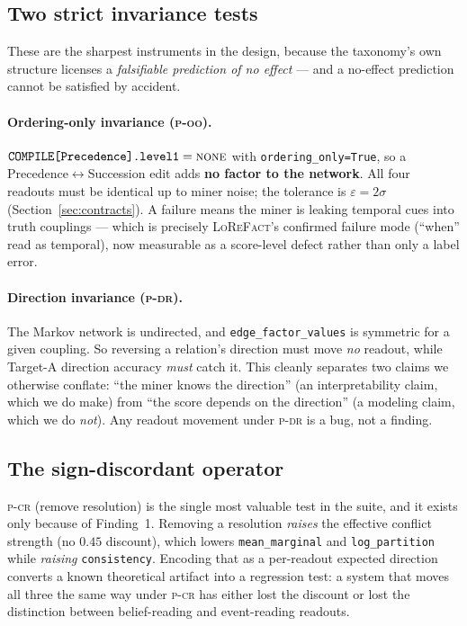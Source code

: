 \documentclass[11pt]{article}
\newcommand{\cNone}{\textsc{none}}
\newcommand{\readout}[1]{\texttt{#1}}
\begin{document}
\subsection{Two strict invariance tests}
\label{sec:invariance}

These are the sharpest instruments in the design, because the taxonomy's own structure
licenses a \emph{falsifiable prediction of no effect} --- and a no-effect prediction cannot be
satisfied by accident.

\paragraph{Ordering-only invariance (\textsc{p-oo}).}
$\texttt{COMPILE[Precedence].level1} = \cNone$ with \texttt{ordering\_only=True}, so a
Precedence$\leftrightarrow$Succession edit adds \textbf{no factor to the network}. All four
readouts must be identical up to miner noise; the tolerance is
$\varepsilon = 2\sigma$ (Section~\ref{sec:contracts}). A failure means the miner is leaking
temporal cues into truth couplings --- which is precisely \textsc{LoReFact}'s confirmed
failure mode (``when'' read as temporal), now measurable as a score-level defect rather than
only a label error.

\paragraph{Direction invariance (\textsc{p-dr}).}
The Markov network is undirected, and \texttt{edge\_factor\_values} is symmetric for a given
coupling. So reversing a relation's direction must move \emph{no} readout, while Target-A
direction accuracy \emph{must} catch it. This cleanly separates two claims we otherwise
conflate: ``the miner knows the direction'' (an interpretability claim, which we do make) from
``the score depends on the direction'' (a modeling claim, which we do \emph{not}). Any readout
movement under \textsc{p-dr} is a bug, not a finding.

\subsection{The sign-discordant operator}
\label{sec:signdiscord}

\textsc{p-cr} (remove resolution) is the single most valuable test in the suite, and it exists
only because of Finding~1. Removing a resolution \emph{raises} the effective conflict strength
(no $0.45$ discount), which lowers \readout{mean\_marginal} and \readout{log\_partition} while
\emph{raising} \readout{consistency}. Encoding that as a per-readout
expected direction converts a known theoretical artifact into a regression test: a system that
moves all three the same way under \textsc{p-cr} has either lost the discount or lost the
distinction between belief-reading and event-reading readouts.
\end{document}
